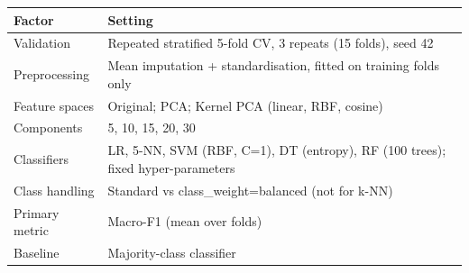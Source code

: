 \begin{tabular}{lp{5.2cm}}
\toprule
Factor & Setting \\
\midrule
Validation & Repeated stratified 5-fold CV, 3 repeats (15 folds), seed 42 \\
Preprocessing & Mean imputation + standardisation, fitted on training folds only \\
Feature spaces & Original; PCA; Kernel PCA (linear, RBF, cosine) \\
Components & 5, 10, 15, 20, 30 \\
Classifiers & LR, 5-NN, SVM (RBF, C=1), DT (entropy), RF (100 trees); fixed hyper-parameters \\
Class handling & Standard vs class\_weight=balanced (not for k-NN) \\
Primary metric & Macro-F1 (mean over folds) \\
Baseline & Majority-class classifier \\
\bottomrule
\end{tabular}
